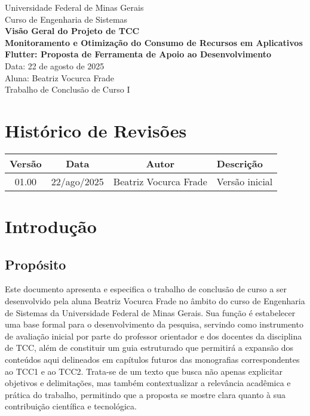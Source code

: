 \documentclass[12pt,a4paper]{article}
\begin{document}
\begin{center}
\Large
Universidade Federal de Minas Gerais \\
Curso de Engenharia de Sistemas \\[3cm]

\textbf{\LARGE Visão Geral do Projeto de TCC} \\[1cm]

\textbf{Monitoramento e Otimização do Consumo de Recursos em Aplicativos Flutter: Proposta de Ferramenta de Apoio ao Desenvolvimento} \\[4cm]

Data: 22 de agosto de 2025 \\[4cm]

Aluna: Beatriz Vocurca Frade \\[3cm]

Trabalho de Conclusão de Curso I
\end{center}

\newpage

\section*{Histórico de Revisões}

\begin{longtable}{|c|c|c|p{7cm}|}
\hline
\textbf{Versão} & \textbf{Data} & \textbf{Autor} & \textbf{Descrição} \\ \hline
01.00 & 22/ago/2025 & Beatriz Vocurca Frade & Versão inicial \\ \hline
\end{longtable}

\newpage

\tableofcontents
\newpage

\section{Introdução}

\subsection{Propósito}
Este documento apresenta e especifica o trabalho de conclusão de curso a ser desenvolvido pela aluna Beatriz Vocurca Frade no âmbito do curso de Engenharia de Sistemas da Universidade Federal de Minas Gerais. Sua função é estabelecer uma base formal para o desenvolvimento da pesquisa, servindo como instrumento de avaliação inicial por parte do professor orientador e dos docentes da disciplina de TCC, além de constituir um guia estruturado que permitirá a expansão dos conteúdos aqui delineados em capítulos futuros das monografias correspondentes ao TCC1 e ao TCC2. Trata-se de um texto que busca não apenas explicitar objetivos e delimitações, mas também contextualizar a relevância acadêmica e prática do trabalho, permitindo que a proposta se mostre clara quanto à sua contribuição científica e tecnológica.
\end{document}
